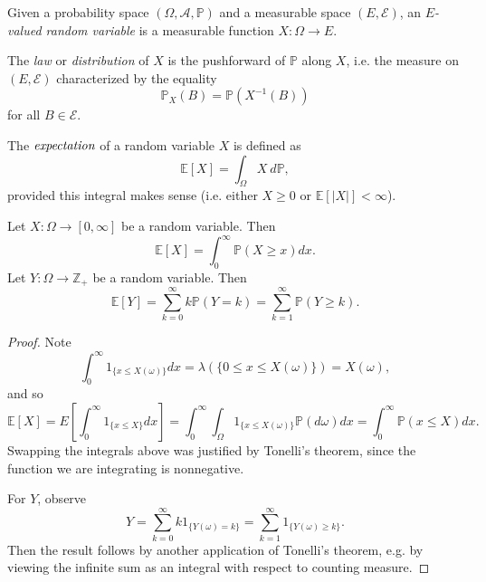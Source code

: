 \documentclass[12pt]{article}
\begin{document}
\begin{definition}
	Given a probability space $(\Omega, \mathcal{A}, \mathbb{P})$ and a measurable space $(E, \mathcal{E})$, an \emph{$E$-valued random variable} is a measurable function $X:\Omega \to E$.
\end{definition}

\begin{definition}
	The \emph{law} or \emph{distribution} of $X$ is the pushforward of $\mathbb{P}$ along $X$, i.e. the measure on $(E,\mathcal{E})$ characterized by the equality 
	\begin{equation*}
		\mathbb{P}_X(B) = \mathbb{P}(X^{-1}(B))
	\end{equation*}
	for all $B\in\mathcal{E}$.
\end{definition}

\begin{definition}
	The $\emph{expectation}$ of a random variable $X$ is defined as 
	\begin{equation*}
		\mathbb{E}[X] = \int_\Omega X\ d\mathbb{P},
	\end{equation*}
	provided this integral makes sense (i.e. either $X\geq 0$ or $\mathbb{E}[ |X| ]<\infty$).
\end{definition}

\begin{proposition}
	Let $X:\Omega\to[0,\infty]$ be a random variable. Then 
	\begin{equation*}
		\mathbb{E}[X] = \int_0^\infty \mathbb{P}(X\geq x) dx.
	\end{equation*}
	Let $Y:\Omega\to\mathbb{Z}_+$ be a random variable. Then 
	\begin{equation*}
		\mathbb{E}[Y] = \sum_{k=0}^\infty k\mathbb{P}(Y=k)=\sum_{k=1}^\infty \mathbb{P}(Y\geq k).
	\end{equation*}
\end{proposition}
\begin{proof}
	Note 
	\begin{equation*}
		\int_0^\infty 1_{\{x\leq X(\omega)\}} dx = \lambda(\{0\leq x \leq X(\omega)\}) = X(\omega), 
	\end{equation*}
	and so 
	\begin{equation*}
		\mathbb{E}[X] 
		= E\left[ \int_0^\infty 1_{\{x\leq X\}} dx \right]
		= \int_0^\infty \int_\Omega 1_{\{x\leq X(\omega)\}} \mathbb{P}(d\omega)dx
		= \int_0^\infty \mathbb{P}(x\leq X)dx.
	\end{equation*}
	Swapping the integrals above was justified by Tonelli's theorem, since the function we are integrating is nonnegative.

	For $Y$, observe
	\begin{equation*}
		Y = \sum_{k=0}^\infty k 1_{\{Y(\omega)=k\}} = \sum_{k=1}^\infty 1_{\{Y(\omega)\geq k\}}.
	\end{equation*}
	Then the result follows by another application of Tonelli's theorem, e.g. by viewing the infinite sum as an integral with respect to counting measure.
\end{proof}
\end{document}
